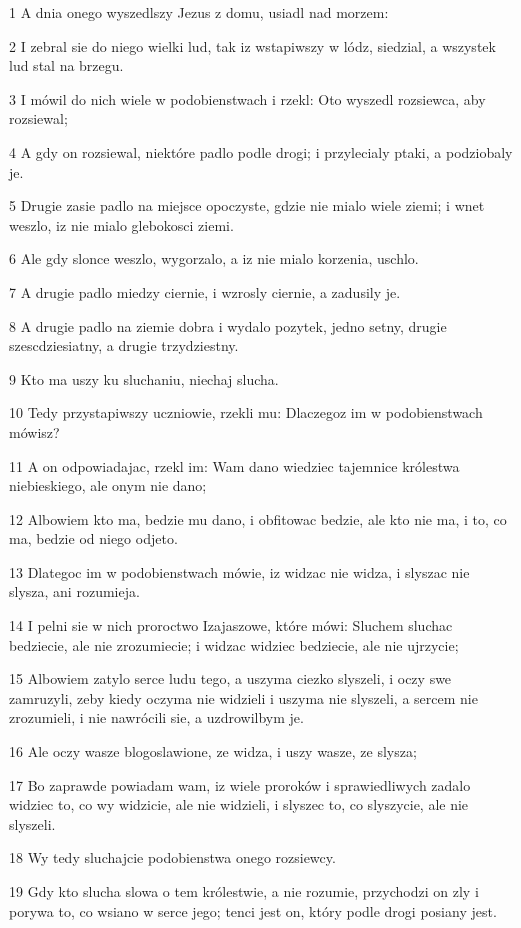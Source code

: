 \par 1 A dnia onego wyszedlszy Jezus z domu, usiadl nad morzem:
\par 2 I zebral sie do niego wielki lud, tak iz wstapiwszy w lódz, siedzial, a wszystek lud stal na brzegu.
\par 3 I mówil do nich wiele w podobienstwach i rzekl: Oto wyszedl rozsiewca, aby rozsiewal;
\par 4 A gdy on rozsiewal, niektóre padlo podle drogi; i przylecialy ptaki, a podziobaly je.
\par 5 Drugie zasie padlo na miejsce opoczyste, gdzie nie mialo wiele ziemi; i wnet weszlo, iz nie mialo glebokosci ziemi.
\par 6 Ale gdy slonce weszlo, wygorzalo, a iz nie mialo korzenia, uschlo.
\par 7 A drugie padlo miedzy ciernie, i wzrosly ciernie, a zadusily je.
\par 8 A drugie padlo na ziemie dobra i wydalo pozytek, jedno setny, drugie szescdziesiatny, a drugie trzydziestny.
\par 9 Kto ma uszy ku sluchaniu, niechaj slucha.
\par 10 Tedy przystapiwszy uczniowie, rzekli mu: Dlaczegoz im w podobienstwach mówisz?
\par 11 A on odpowiadajac, rzekl im: Wam dano wiedziec tajemnice królestwa niebieskiego, ale onym nie dano;
\par 12 Albowiem kto ma, bedzie mu dano, i obfitowac bedzie, ale kto nie ma, i to, co ma, bedzie od niego odjeto.
\par 13 Dlategoc im w podobienstwach mówie, iz widzac nie widza, i slyszac nie slysza, ani rozumieja.
\par 14 I pelni sie w nich proroctwo Izajaszowe, które mówi: Sluchem sluchac bedziecie, ale nie zrozumiecie; i widzac widziec bedziecie, ale nie ujrzycie;
\par 15 Albowiem zatylo serce ludu tego, a uszyma ciezko slyszeli, i oczy swe zamruzyli, zeby kiedy oczyma nie widzieli i uszyma nie slyszeli, a sercem nie zrozumieli, i nie nawrócili sie, a uzdrowilbym je.
\par 16 Ale oczy wasze blogoslawione, ze widza, i uszy wasze, ze slysza;
\par 17 Bo zaprawde powiadam wam, iz wiele proroków i sprawiedliwych zadalo widziec to, co wy widzicie, ale nie widzieli, i slyszec to, co slyszycie, ale nie slyszeli.
\par 18 Wy tedy sluchajcie podobienstwa onego rozsiewcy.
\par 19 Gdy kto slucha slowa o tem królestwie, a nie rozumie, przychodzi on zly i porywa to, co wsiano w serce jego; tenci jest on, który podle drogi posiany jest.

